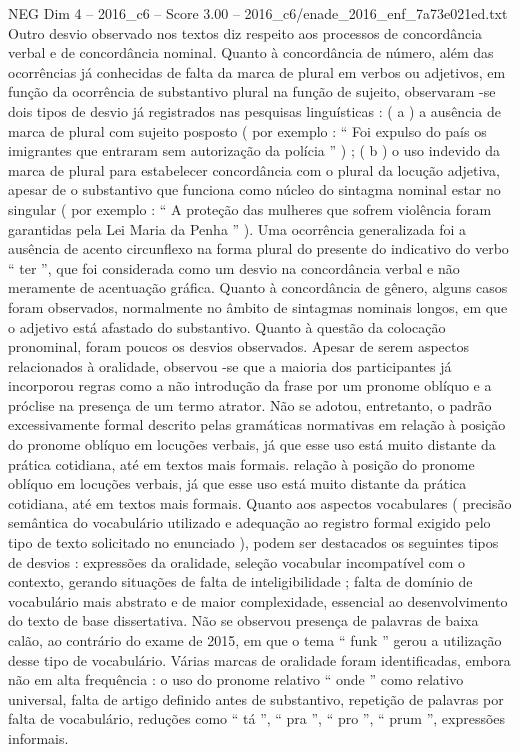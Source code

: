 \begin{textsample}{NEG Dim 4 – 2016\_c6 – Score 3.00 – 2016\_c6/enade\_2016\_enf\_7a73e021ed.txt}
Outro desvio observado nos textos diz respeito aos processos de concordância verbal e de concordância nominal.
Quanto à concordância de número, além das ocorrências já conhecidas de falta da marca de plural em verbos ou adjetivos, em função da ocorrência de substantivo plural na função de sujeito, observaram -se dois tipos de desvio já registrados nas pesquisas linguísticas : ( a ) a ausência de marca de plural com sujeito posposto ( por exemplo : “ Foi expulso do país os imigrantes que entraram sem autorização da polícia ” ) ; ( b ) o uso indevido da marca de plural para estabelecer concordância com o plural da locução adjetiva, apesar de o substantivo que funciona como núcleo do sintagma nominal estar no singular ( por exemplo : “ A proteção das mulheres que sofrem violência foram garantidas pela Lei Maria da Penha ” ).
Uma ocorrência generalizada foi a ausência de acento circunflexo na forma plural do presente do indicativo do verbo “ ter ”, que foi considerada como um desvio na concordância verbal e não meramente de acentuação gráfica.
Quanto à concordância de gênero, alguns casos foram observados, normalmente no âmbito de sintagmas nominais longos, em que o adjetivo está afastado do substantivo.
Quanto à questão da colocação pronominal, foram poucos os desvios observados.
Apesar de serem aspectos relacionados à oralidade, observou -se que a maioria dos participantes já incorporou regras como a não introdução da frase por um pronome oblíquo e a próclise na presença de um termo atrator.
Não se adotou, entretanto, o padrão excessivamente formal descrito pelas gramáticas normativas em relação à posição do pronome oblíquo em locuções verbais, já que esse uso está muito distante da prática cotidiana, até em textos mais formais. relação à posição do pronome oblíquo em locuções verbais, já que esse uso está muito distante da prática cotidiana, até em textos mais formais.
Quanto aos aspectos vocabulares ( precisão semântica do vocabulário utilizado e adequação ao registro formal exigido pelo tipo de texto solicitado no enunciado ), podem ser destacados os seguintes tipos de desvios : expressões da oralidade, seleção vocabular incompatível com o contexto, gerando situações de falta de inteligibilidade ; falta de domínio de vocabulário mais abstrato e de maior complexidade, essencial ao desenvolvimento do texto de base dissertativa.
Não se observou presença de palavras de baixa calão, ao contrário do exame de 2015, em que o tema “ funk ” gerou a utilização desse tipo de vocabulário.
Várias marcas de oralidade foram identificadas, embora não em alta frequência : o uso do pronome relativo “ onde ” como relativo universal, falta de artigo definido antes de substantivo, repetição de palavras por falta de vocabulário, reduções como “ tá ”, “ pra ”, “ pro ”, “ prum ”, expressões informais.

\end{textsample}
